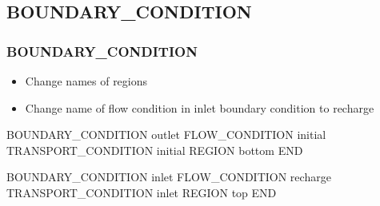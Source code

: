 \documentclass{beamer}
\newcommand\redcomment[1]{{{\color{red} #1}}}
\newcommand\greencomment[1]{{{\color{green} #1}}}
\newcommand\magentacomment[1]{{{\color{magenta} #1}}}
\begin{document}
\subsection{BOUNDARY\_CONDITION}

\begin{frame}[fragile]\frametitle{BOUNDARY\_CONDITION}

\begin{itemize}
\item Change names of regions
\item Change name of flow condition in \redcomment{inlet} boundary condition to \greencomment{recharge}
\end{itemize}

\begin{semiverbatim}

BOUNDARY_CONDITION outlet
  FLOW_CONDITION initial
  TRANSPORT_CONDITION initial
  REGION \magentacomment{bottom}
END

BOUNDARY_CONDITION inlet
  FLOW_CONDITION \magentacomment{recharge}
  TRANSPORT_CONDITION inlet
  REGION \magentacomment{top}
END
\end{semiverbatim}

\end{frame}
\end{document}

